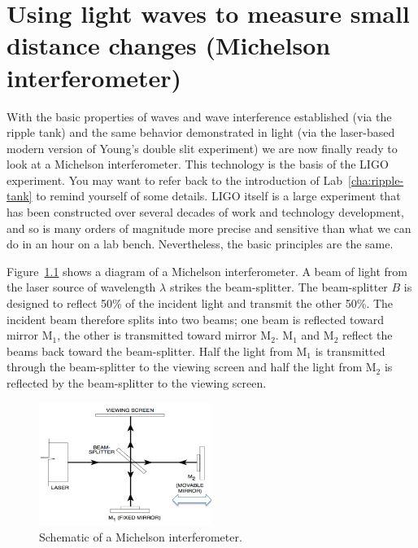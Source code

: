 \chapter{Using light waves to measure small distance changes (Michelson interferometer)}


With the basic properties of waves and wave interference established (via the ripple tank) and the same behavior
demonstrated in light (via the laser-based modern version of Young's double slit experiment) we are now finally ready to
look at a Michelson interferometer. This technology is the basis of the LIGO experiment. You may want to refer back to
the introduction of Lab~\ref{cha:ripple-tank} to remind yourself of some details. LIGO itself is a large experiment that has
been constructed over several decades of work and technology development, and so is many orders of magnitude more
precise and sensitive than what we can do in an hour on a lab bench. Nevertheless, the basic principles are the same.

Figure~\ref{mi:fig:schematic} shows a diagram of a Michelson interferometer. A beam of light from the laser source of wavelength $\lambda$
strikes the beam-splitter. The beam-splitter $B$ is designed to reflect 50\% of the incident light and transmit the other 50\%.
The incident beam therefore splits into two beams; one beam is reflected toward mirror M$_1$, the other is transmitted
toward mirror M$_2$. M$_1$ and M$_2$ reflect the beams back toward the beam-splitter. Half the light from M$_1$ is transmitted
through the beam-splitter to the viewing screen and half the light from M$_2$ is reflected by the beam-splitter to the
viewing screen.

\begin{figure}
	\centering
	\includegraphics[width=0.5\textwidth]{michelson-interferometer/michelson-schematic.png}
	\caption{Schematic of a Michelson interferometer.}\label{mi:fig:schematic}
\end{figure}

